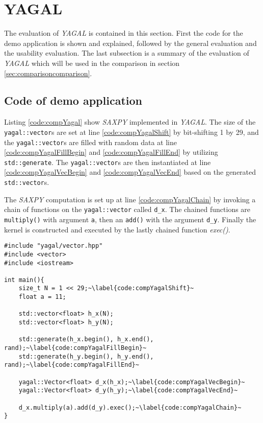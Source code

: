 \section{YAGAL}
The evaluation of \textit{YAGAL} is contained in this section. First the code for the demo application is shown and explained, followed by the general evaluation and the usability evaluation. The last subsection is a summary of the evaluation of \textit{YAGAL} which will be used in the comparison in section \ref{sec:comparisoncomparison}.

\subsection{Code of demo application}
Listing \ref{code:compYagal} show \textit{SAXPY} implemented in \textit{YAGAL}. The size of the \texttt{yagal::vector}s are set at line \ref{code:compYagalShift} by bit-shifting 1 by 29, and the \texttt{yagal::vector}s are filled with random data at line \ref{code:compYagalFillBegin} and \ref{code:compYagalFillEnd} by utilizing \texttt{std::generate}. The \texttt{yagal::vector}s are then instantiated at line \ref{code:compYagalVecBegin} and \ref{code:compYagalVecEnd} based on the generated \texttt{std::vector}s.

The \textit{SAXPY} computation is set up at line \ref{code:compYagalChain} by invoking a chain of functions on the \texttt{yagal::vector} called \texttt{d\_x}. The chained functions are \texttt{multiply()} with argument \texttt{a}, then an \texttt{add()} with the argument \texttt{d\_y}. Finally the kernel is constructed and executed by the lastly chained function \textit{exec()}.

\begin{lstlisting}[caption={\textit{YAGAL} \textit{SAXPY}.}, label={code:compYagal}]
#include "yagal/vector.hpp"
#include <vector>
#include <iostream>

int main(){
    size_t N = 1 << 29;~\label{code:compYagalShift}~
    float a = 11;

    std::vector<float> h_x(N);
    std::vector<float> h_y(N);

    std::generate(h_x.begin(), h_x.end(), rand);~\label{code:compYagalFillBegin}~
    std::generate(h_y.begin(), h_y.end(), rand);~\label{code:compYagalFillEnd}~

    yagal::Vector<float> d_x(h_x);~\label{code:compYagalVecBegin}~
    yagal::Vector<float> d_y(h_y);~\label{code:compYagalVecEnd}~
    
    d_x.multiply(a).add(d_y).exec();~\label{code:compYagalChain}~
}
\end{lstlisting}

